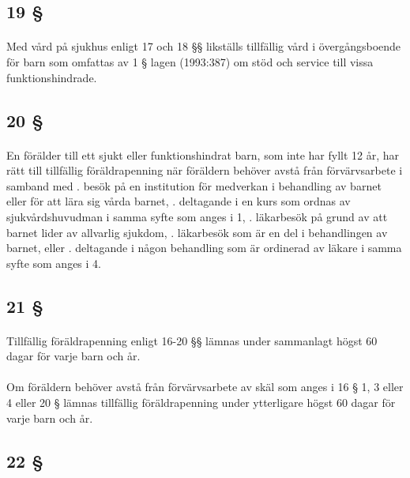 \documentclass[a4paper,notitlepage,openany,10pt]{book}
\begin{document}
\subsection*{19 §}
\paragraph*{}
Med vård på sjukhus enligt 17 och 18 §§ likställs tillfällig vård i övergångsboende för barn som omfattas av 1 § lagen (1993:387) om stöd och service till vissa funktionshindrade.
\subsection*{20 §}
\paragraph*{}
En förälder till ett sjukt eller funktionshindrat barn, som inte har fyllt 12 år, har rätt till tillfällig föräldrapenning när föräldern behöver avstå från förvärvsarbete i samband med
. besök på en institution för medverkan i behandling av barnet eller för att lära sig vårda barnet,
. deltagande i en kurs som ordnas av sjukvårdshuvudman i samma syfte som anges i 1,
. läkarbesök på grund av att barnet lider av allvarlig sjukdom,
. läkarbesök som är en del i behandlingen av barnet, eller
. deltagande i någon behandling som är ordinerad av läkare i samma syfte som anges i 4.
\subsection*{21 §}
\paragraph*{}
Tillfällig föräldrapenning enligt 16-20 §§ lämnas under sammanlagt högst 60 dagar för varje barn och år.
\paragraph*{}
Om föräldern behöver avstå från förvärvsarbete av skäl som anges i 16 § 1, 3 eller 4 eller 20 § lämnas tillfällig föräldrapenning under ytterligare högst 60 dagar för varje barn och år.
\subsection*{22 §}
\end{document}
